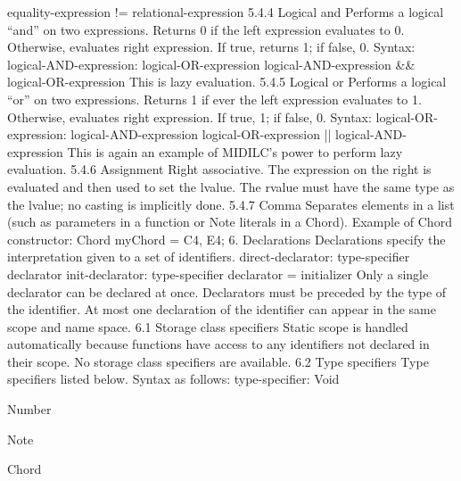 \documentclass[12pt,A4]{book}
\begin{document}
equality-expression != relational-expression
5.4.4 Logical and
Performs a logical “and” on two expressions. Returns 0 if the left expression evaluates to 0. Otherwise, evaluates right expression. If true, returns 1; if false, 0.
Syntax:
logical-AND-expression: logical-OR-expression
               logical-AND-expression && logical-OR-expression
This is lazy evaluation.
5.4.5 Logical or
Performs a logical “or” on two expressions. Returns 1 if ever the left expression evaluates to 1. Otherwise, evaluates right expression. If true, 1; if false, 0.
Syntax:
logical-OR-expression: logical-AND-expression
               logical-OR-expression || logical-AND-expression
This is again an example of MIDILC’s power to perform lazy evaluation.
5.4.6 Assignment
Right associative. The expression on the right is evaluated and then used to set the lvalue. The rvalue must have the same type as the lvalue; no casting is implicitly done.
5.4.7 Comma
Separates elements in a list (such as parameters in a function or Note literals in a Chord). Example of Chord constructor:
Chord myChord = {C4, E4};
6. Declarations
Declarations specify the interpretation given to a set of identifiers.
direct-declarator:    type-specifier declarator
init-declarator:    type-specifier declarator = initializer
Only a single declarator can be declared at once.  Declarators must be preceded by the type of the identifier.  At most one declaration of the identifier can appear in the same scope and name space.  
6.1 Storage class specifiers
Static scope is handled automatically because functions have access to any identifiers not declared in their scope. No storage class specifiers are available.
6.2 Type specifiers
Type specifiers listed below.  Syntax as follows:
type-specifier:    Void

    Number

    Note

    Chord
\end{document}

